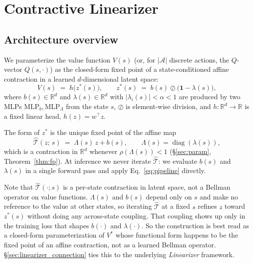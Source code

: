 \documentclass{article}
\newcommand{\R}{\mathbb{R}}
\newcommand{\cT}{\hat{\mathcal{T}}}          %
\newcommand{\zstar}{z^*}                     %
\newcommand{\spb}{\alpha}                    %
\newcommand{\eigs}{\lambda}                  %
\begin{document}
\section{Contractive Linearizer}
\label{sec:method}

\subsection{Architecture overview}
\label{sec:overview}

We parameterize the value function $V(s)$ (or, for $|\mathcal{A}|$ discrete
actions, the $Q$-vector $Q(s,\cdot)$) as the closed-form fixed point of a
state-conditioned affine contraction in a learned $d$-dimensional latent space:
\begin{equation}
  V(s) \;=\; h\bigl(\zstar(s)\bigr),
  \qquad
  \zstar(s) \;=\; b(s) \oslash \bigl(\mathbf{1} - \eigs(s)\bigr),
  \label{eq:pipeline}
\end{equation}
where $b(s) \in \R^d$ and $\eigs(s) \in \R^d$ with $|\eigs_i(s)| < \spb < 1$
are produced by two MLPs $\mathrm{MLP}_b, \mathrm{MLP}_\Lambda$ from the state
$s$, $\oslash$ is element-wise division, and $h: \R^d \to \R$ is a fixed linear
head, $h(z) = w^\top z$.

The form of $\zstar$ is the unique fixed point of the affine map
\begin{equation}
  \cT(z;\,s) \;=\; \Lambda(s)\, z + b(s),
  \qquad
  \Lambda(s) = \operatorname{diag}(\eigs(s)),
  \label{eq:Tdef_overview}
\end{equation}
which is a contraction in $\R^d$ whenever $\rho(\Lambda(s)) < 1$
(\S\ref{sec:param}, Theorem~\ref{thm:fp}). At inference we never iterate $\cT$:
we evaluate $b(s)$ and $\eigs(s)$ in a single forward pass and apply
Eq.~\eqref{eq:pipeline} directly.

Note that $\cT(\cdot;s)$ is a per-state contraction in latent space, not a Bellman
operator on value functions. $\Lambda(s)$ and $b(s)$ depend only on $s$ and
make no reference to the value at other states, so iterating $\cT$ at a
fixed $s$ refines $z$ toward $\zstar(s)$ without doing any across-state
coupling. That coupling shows up only in the training loss that shapes
$b(\cdot)$ and $\eigs(\cdot)$. So the construction is best read as a
closed-form parameterization of $V^*$ whose functional form happens to be the
fixed point of an affine contraction, not as a learned Bellman operator.
\S\ref{sec:linearizer_connection} ties this to the underlying \emph{Linearizer}
framework.
\end{document}
